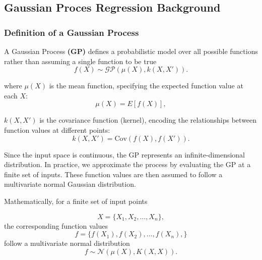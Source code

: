 \documentclass[12pt]{article}
\begin{document}
\subsection{Gaussian Proces Regression Background}
\label{sec: GP_backgroound}

\subsubsection*{Definition of a Gaussian Process}
\label{sec: Definition_of_GP}

A Gaussian Process \textbf{(GP)} defines a probabilistic model over all possible functions rather than assuming a single function to be true
\begin{equation}
f(X) \sim \mathcal{GP} (\mu(X), k(X, X')).
\label{eq: Initial_GP_distribution}
\end{equation}

\noindent
where \( \mu(X) \) is the mean function, specifying the expected function value at each \( X \):
\begin{equation}
    \mu(X) = {E}[f(X)],
    \label{eq: meandef}
\end{equation}

\noindent
 \( k(X, X') \) is the covariance function (kernel), encoding the relationships between function values at different points:
\begin{equation}
    k(X, X') = \text{Cov}(f(X), f(X')).
    \label{eq: kerneldef}
\end{equation}

\noindent
Since the input space is continuous, the GP represents an infinite-dimensional distribution. 
In practice, we approximate the process by evaluating the GP at a finite set of inputs.
These function values are then assumed to follow a multivariate normal Gaussian distribution.

\noindent
Mathematically, for a finite set of input points

\begin{equation}
X = \{X_1, X_2, \dots, X_n\},
\end{equation}
 the corresponding function values
\begin{equation}
f = \{f(X_1),f(X_2),...,f(X_n), \}
\end{equation}
follow a multivariate normal distribution
\begin{equation}
f \sim \mathcal{N}\left(\mu(X), K(X, X)\right).
\label{eq: Multivariate_distribution}
\end{equation}
\end{document}
